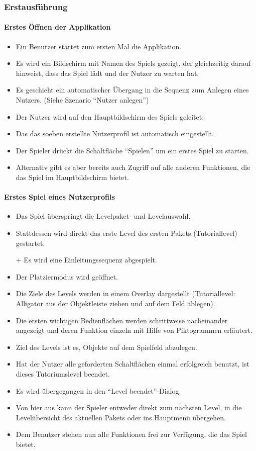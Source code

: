\subsubsection{Erstausführung}
\paragraph{Erstes Öffnen der Applikation}
\begin{itemize}
\item Ein Benutzer startet zum ersten Mal die Applikation. 
\item Es wird ein Bildschirm mit Namen des Spiels gezeigt, der gleichzeitig darauf
hinweist, dass das Spiel lädt und der Nutzer zu warten hat.
\item Es geschieht ein automatischer Übergang in die Sequenz zum
Anlegen eines Nutzers. \newline (Siehe Szenario "`Nutzer anlegen"')
\item Der Nutzer wird auf den Hauptbildschirm des Spiels geleitet. 
\item Das das soeben erstellte Nutzerprofil ist automatisch eingestellt.
\item Der Spieler drückt die Schaltfläche "`Spielen"' um ein erstes Spiel zu starten.
\item Alternativ gibt es aber bereits auch Zugriff auf alle anderen Funktionen,
die das Spiel im Hauptbildschirm bietet.
\end{itemize}

\paragraph{Erstes Spiel eines Nutzerprofils}
\begin{itemize}
\item Das Spiel überspringt die Levelpaket- und Levelauswahl.
\item Stattdessen wird direkt das erste Level des ersten Pakets (Tutoriallevel) gestartet.
\item[+] Es wird eine Einleitungssequenz abgespielt.
\item Der Platziermodus wird geöffnet.
\item Die Ziele des Levels werden in einem Overlay dargestellt (Tutoriallevel: Alligator aus der Objektleiste ziehen und auf dem Feld ablegen).
\item Die ersten wichtigen Bedienflächen werden schrittweise nacheinander angezeigt und deren Funktion
einzeln mit Hilfe von Piktogrammen erläutert.
\item Ziel des Levels ist es, Objekte auf dem Spielfeld abzulegen.
\item Hat der Nutzer alle geforderten Schaltflächen einmal erfolgreich benutzt, ist dieses Tutoriumslevel beendet.
\item Es wird übergegangen in den "`Level beendet"'-Dialog. 
\item Von hier aus kann der Spieler entweder direkt zum nächsten Level, in die Levelübersicht des aktuellen Pakets oder
ins Hauptmenü übergehen.
\item Dem Benutzer stehen nun alle Funktionen frei zur Verfügung, die das Spiel 
bietet.
\end{itemize}
